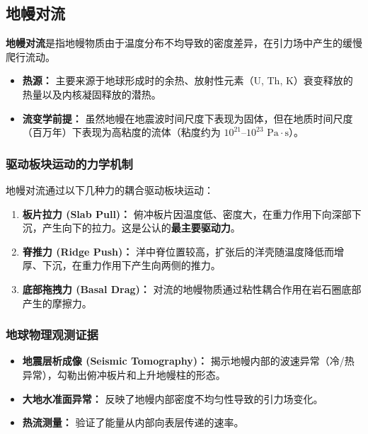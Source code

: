 \documentclass[12pt,a4paper]{article}
\begin{document}
	\subsection{地幔对流}
	\textbf{地幔对流}是指地幔物质由于温度分布不均导致的密度差异，在引力场中产生的缓慢爬行流动。
	\begin{itemize}
		\item \textbf{热源：} 主要来源于地球形成时的余热、放射性元素（U, Th, K）衰变释放的热量以及内核凝固释放的潜热。
		\item \textbf{流变学前提：} 虽然地幔在地震波时间尺度下表现为固体，但在地质时间尺度（百万年）下表现为高粘度的流体（粘度约为 $10^{21} \text{--} 10^{23} \text{ Pa}\cdot\text{s}$）。
	\end{itemize}
	
	\subsubsection{驱动板块运动的力学机制}
	地幔对流通过以下几种力的耦合驱动板块运动：
	
	\begin{enumerate}
		\item \textbf{板片拉力 (Slab Pull)：} 俯冲板片因温度低、密度大，在重力作用下向深部下沉，产生向下的拉力。这是公认的\textbf{最主要驱动力}。
		\item \textbf{脊推力 (Ridge Push)：} 洋中脊位置较高，扩张后的洋壳随温度降低而增厚、下沉，在重力作用下产生向两侧的推力。
		\item \textbf{底部拖拽力 (Basal Drag)：} 对流的地幔物质通过粘性耦合作用在岩石圈底部产生的摩擦力。
	\end{enumerate}
	
	
	
	\subsubsection{地球物理观测证据}
	\begin{itemize}
		\item \textbf{地震层析成像 (Seismic Tomography)：} 揭示地幔内部的波速异常（冷/热异常），勾勒出俯冲板片和上升地幔柱的形态。
		\item \textbf{大地水准面异常：} 反映了地幔内部密度不均匀性导致的引力场变化。
		\item \textbf{热流测量：} 验证了能量从内部向表层传递的速率。
	\end{itemize}
\end{document}

